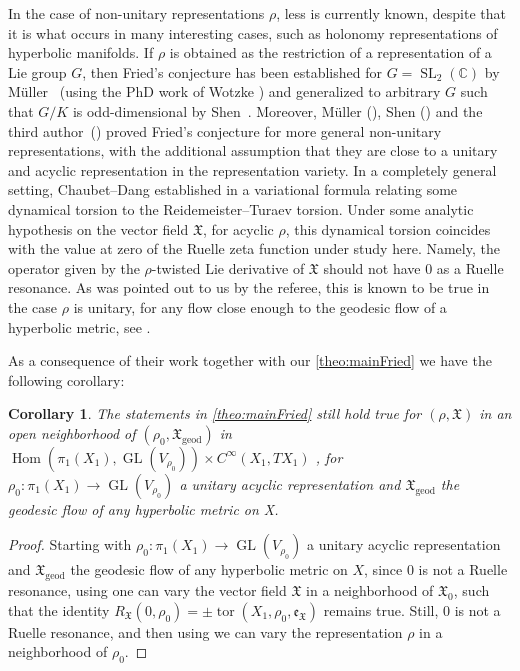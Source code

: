 \documentclass[10pt]{amsart}
\theoremstyle{plain}
\newtheorem{coralph}[thmalph]{Corollary}
\theoremstyle{definition}
\theoremstyle{remark}
\newcommand{\C}{\mathbb{C}}
\newcommand{\geod}{\mathrm{geod}}
\DeclareMathOperator{\SL}{SL}
\DeclareMathOperator{\GL}{GL}
\numberwithin{equation}{section}
\DeclareMathOperator{\tor}{tor}
\begin{document}
In the case of non-unitary representations $\rho$, less is currently known, despite that it is what occurs in many interesting cases, such as holonomy representations of hyperbolic manifolds. If $\rho$ is obtained as the restriction of a representation of a Lie group $G$, then Fried's conjecture has been established for $G=\SL_2(\C)$ by Müller~\cite{M2} (using the PhD work of Wotzke \cite{Wo}) and generalized to arbitrary $G$ such that $G/K$ is odd-dimensional by Shen~\cite{Shen21}. Moreover, Müller (\cite{muller2021ruelle}), Shen (\cite{Shen2020}) and the third author~(\cite{Spilioti20}) proved Fried's conjecture for more general non-unitary representations, with the additional assumption that they are close to a unitary and acyclic representation in the representation variety. In a completely general setting, Chaubet--Dang established in \cite{chaubet2019dynamical} a variational formula relating some dynamical torsion to the Reidemeister--Turaev torsion. Under some analytic hypothesis on the vector field $\mathfrak X$, for acyclic $\rho$, this dynamical torsion coincides with the value at zero of the Ruelle zeta function under study here. Namely, the operator given by the $\rho$-twisted Lie derivative of $\mathfrak X$ should not have $0$ as a Ruelle resonance. As was pointed out to us by the referee, this is known to be true in the case $\rho$ is unitary, for any flow close enough to the geodesic flow of a hyperbolic metric, see \cite[Lem.\,7.4]{dang2019fried}.

As a consequence of their work together with our \cref{theo:mainFried} we have the following corollary:
\begin{coralph}
The statements in \cref{theo:mainFried} still hold true for $(\rho, \mathfrak X)$ in an open neighborhood of $(\rho_0, \mathfrak X_\geod)$ in $\operatorname{Hom}(\pi_1(X_1), \GL(V_{\rho_0})) \times C^{\infty}(X_1, TX_1)$ , for $\rho_0 \colon \pi_1(X_1) \to \GL(V_{\rho_0})$ a unitary acyclic representation and $\mathfrak X_\geod$ the geodesic flow of any hyperbolic metric on X.
\end{coralph}

\begin{proof}
Starting with $\rho_0 \colon \pi_1(X_1) \to \GL(V_{\rho_0})$ a unitary acyclic representation and $\mathfrak X_\geod$ the geodesic flow of any hyperbolic metric on $X$, since $0$ is not a Ruelle resonance, using \cite[Th.\,2]{dang2019fried} one can vary the vector field $\mathfrak X$ in a neighborhood of $\mathfrak X_0$, such that the identity $R_{\mathfrak X}(0, \rho_0) = \pm \tor(X_1, \rho_0, \mathfrak e_{\mathfrak X})$
remains true. Still, $0$ is not a Ruelle resonance, and then using \cite[Th.\,4]{chaubet2019dynamical} we can vary the representation $\rho$ in a neighborhood of $\rho_0$.
\end{proof}
\end{document}
